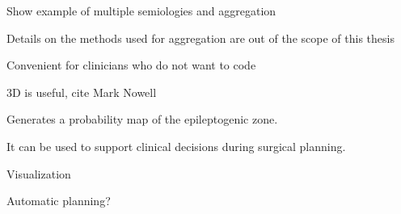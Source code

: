 Show example of multiple semiologies and aggregation

Details on the methods used for aggregation are out of the scope of this thesis

Convenient for clinicians who do not want to code

3D is useful, cite Mark Nowell

Generates a probability map of the epileptogenic zone.

It can be used to support clinical decisions during surgical planning.

Visualization

Automatic planning?
